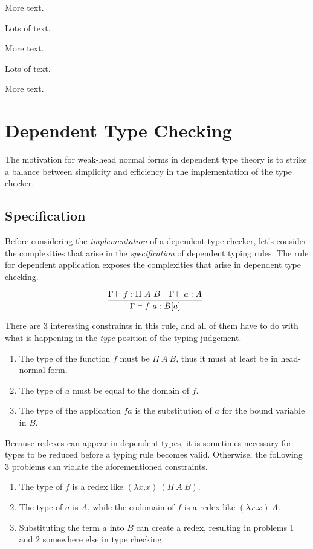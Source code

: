 \documentclass[preprint,authoryear]{sigplanconf}
\def\turn{\vdash}
\begin{document}
More text.


Lots of text.

More text.

Lots of text.

More text.

\section{Dependent Type Checking}

The motivation for weak-head normal forms in dependent type theory is
to strike a balance between simplicity and efficiency in the
implementation of the type checker. 

\subsection{Specification}

Before considering the {\it implementation} of a dependent type checker,
let's consider the complexities that arise in the
{\it specification} of dependent typing rules.
The rule for dependent application exposes the complexities
that arise in dependent type checking.

$$
\infer[]
  {\Gamma \turn f~a : B[a]}
{
  \Gamma \turn f : \Pi~A~B
  &
  \Gamma \turn a : A
}
$$

There are 3 interesting
constraints in this rule, and all of them have to do with what is
happening in the {\it type} position of the typing judgement.

\begin{enumerate}
\item The type of the function $f$ must be $\Pi~A~B$, thus it must at
  least be in head-normal form.
\item The type of $a$ must be equal to the domain of $f$.
\item The type of the application $f a$ is the substitution of $a$ for
  the bound variable in $B$.
\end{enumerate}

Because redexes can appear in dependent types, it is sometimes
necessary for types to be reduced before a typing rule becomes valid.
Otherwise, the following 3 problems can violate the aforementioned
constraints.

\begin{enumerate}
\item The type of $f$ is a redex like $(\lambda x. x)~(\Pi~A~B)$.
\item The type of $a$ is $A$, while the codomain of $f$ is a redex like
$(\lambda x. x)~A$.
\item Substituting the term $a$ into $B$ can create a redex, resulting
  in problems 1 and 2 somewhere else in type checking.
\end{enumerate}
\end{document}

